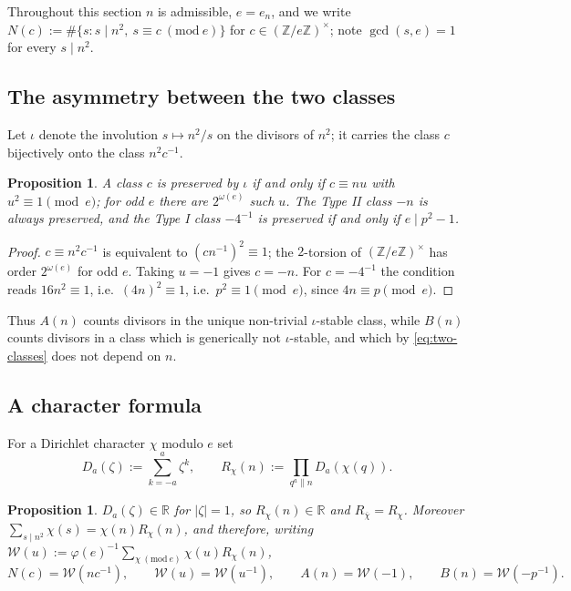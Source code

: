 \documentclass[11pt,reqno]{amsart}
\theoremstyle{plain}
\newtheorem{proposition}[theorem]{Proposition}
\theoremstyle{definition}
\numberwithin{equation}{section}
\newcommand{\Z}{\mathbb{Z}}
\begin{document}
Throughout this section $n$ is admissible, $e=e_{n}$, and we write
$N(c):=\#\{s: s\mid n^{2},\ s\equiv c\ (\mathrm{mod}\ e)\}$ for $c\in(\Z/e\Z)^{\times}$;
note $\gcd(s,e)=1$ for every $s\mid n^{2}$.

\subsection{The asymmetry between the two classes}\label{sec:asym}
Let $\iota$ denote the involution $s\mapsto n^{2}/s$ on the divisors of $n^{2}$; it
carries the class $c$ bijectively onto the class $n^{2}c^{-1}$.

\begin{proposition}\label{prop:iota}
A class $c$ is preserved by $\iota$ if and only if $c\equiv nu$ with $u^{2}\equiv1
\pmod e$; for odd $e$ there are $2^{\omega(e)}$ such $u$. The Type II class $-n$ is
always preserved, and the Type I class $-4^{-1}$ is preserved if and only if
$e\mid p^{2}-1$.
\end{proposition}

\begin{proof}
$c\equiv n^{2}c^{-1}$ is equivalent to $(cn^{-1})^{2}\equiv1$; the $2$-torsion of
$(\Z/e\Z)^{\times}$ has order $2^{\omega(e)}$ for odd $e$. Taking $u=-1$ gives $c=-n$.
For $c=-4^{-1}$ the condition reads $16n^{2}\equiv1$, i.e.\ $(4n)^{2}\equiv1$, i.e.\
$p^{2}\equiv1\pmod e$, since $4n\equiv p\pmod e$.
\end{proof}

Thus $A(n)$ counts divisors in the unique non-trivial $\iota$-stable class, while
$B(n)$ counts divisors in a class which is generically not $\iota$-stable, and which
by \eqref{eq:two-classes} does not depend on $n$.

\subsection{A character formula}
For a Dirichlet character $\chi$ modulo $e$ set
\[
  D_{a}(\zeta):=\sum_{k=-a}^{a}\zeta^{k},\qquad
  R_{\chi}(n):=\prod_{q^{a}\|n}D_{a}(\chi(q)) .
\]

\begin{proposition}\label{prop:char}
$D_{a}(\zeta)\in\mathbb R$ for $|\zeta|=1$, so $R_{\chi}(n)\in\mathbb R$ and
$R_{\overline\chi}=R_{\chi}$. Moreover $\sum_{s\mid n^{2}}\chi(s)=\chi(n)R_{\chi}(n)$,
and therefore, writing
$\mathcal W(u):=\varphi(e)^{-1}\sum_{\chi\ (\mathrm{mod}\ e)}\chi(u)R_{\chi}(n)$,
\[
  N(c)=\mathcal W(nc^{-1}),\qquad \mathcal W(u)=\mathcal W(u^{-1}),\qquad
  A(n)=\mathcal W(-1),\qquad B(n)=\mathcal W(-p^{-1}) .
\]
\end{proposition}
\end{document}

